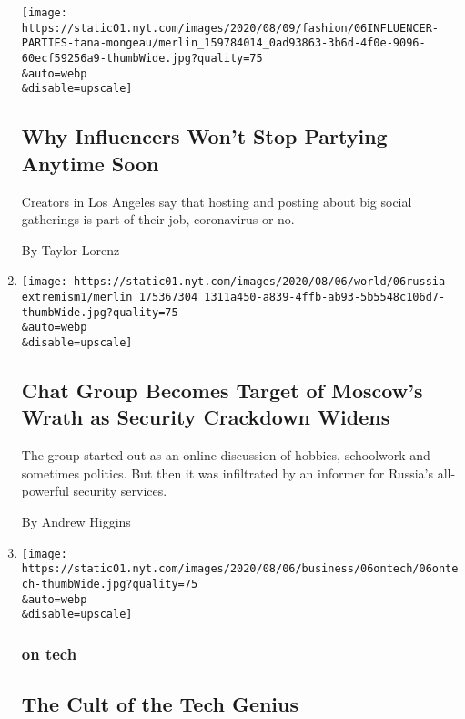 \begin{enumerate}
  \texttt{[image: https://static01.nyt.com/images/2020/08/09/fashion/06INFLUENCER-PARTIES-tana-mongeau/merlin\_159784014\_0ad93863-3b6d-4f0e-9096-60ecf59256a9-thumbWide.jpg?quality=75\\\&auto=webp\\\&disable=upscale]}

  \hypertarget{why-influencers-wont-stop-partying-anytime-soon}{%
  \subsection{Why Influencers Won't Stop Partying Anytime
  Soon}\label{why-influencers-wont-stop-partying-anytime-soon}}

  Creators in Los Angeles say that hosting and posting about big social
  gatherings is part of their job, coronavirus or no.

  By Taylor Lorenz
\item
  \href{/2020/08/06/world/europe/russia-extremisim-chat-group-sentence.html}{}

  \texttt{[image: https://static01.nyt.com/images/2020/08/06/world/06russia-extremism1/merlin\_175367304\_1311a450-a839-4ffb-ab93-5b5548c106d7-thumbWide.jpg?quality=75\\\&auto=webp\\\&disable=upscale]}

  \hypertarget{chat-group-becomes-target-of-moscows-wrath-as-security-crackdown-widens}{%
  \subsection{Chat Group Becomes Target of Moscow's Wrath as Security
  Crackdown
  Widens}\label{chat-group-becomes-target-of-moscows-wrath-as-security-crackdown-widens}}

  The group started out as an online discussion of hobbies, schoolwork
  and sometimes politics. But then it was infiltrated by an informer for
  Russia's all-powerful security services.

  By Andrew Higgins
\item
  \href{/2020/08/06/technology/the-cult-of-the-tech-genius.html}{}

  \texttt{[image: https://static01.nyt.com/images/2020/08/06/business/06ontech/06ontech-thumbWide.jpg?quality=75\\\&auto=webp\\\&disable=upscale]}

  \hypertarget{on-tech-1}{%
  \subsubsection{on tech}\label{on-tech-1}}

  \hypertarget{the-cult-of-the-tech-genius}{%
  \subsection{The Cult of the Tech
  Genius}\label{the-cult-of-the-tech-genius}}


\end{enumerate}
